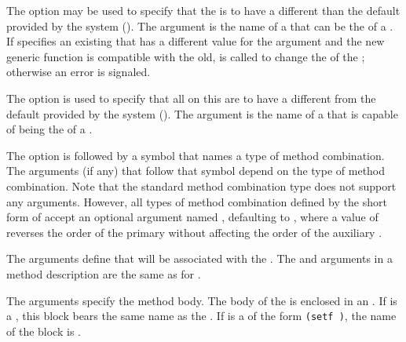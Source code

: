 \itemitem{\bull} 
The  option may be used to specify that
the  is to have a different  than
the default provided by the system ().
The  argument is the name of a  that can be the
 of a .  If  specifies
an existing  that has a different value for the
 argument and the new generic function 
 is compatible with the old,  is called 
to change the  of the ; 
otherwise an error is signaled.
 
\itemitem{\bull} 
The  option is used to specify that all  on
this  are to have a different  from the 
default provided by the system ().
The  argument is the name of a  that is capable 
of being the  of a .
 
\itemitem{\bull} 
The  option is followed by a symbol that
names a type of method combination.  The arguments (if any) that
follow that symbol depend on the type of method combination.  Note
that the standard method combination type does not support any
arguments.  However, all types of method combination defined by the
short form of  accept an optional
argument named , defaulting to ,
where a value of  reverses
the order of the primary  without affecting the order of the
auxiliary .
 
\endlist
 
The  arguments define  that will
be associated with the .  The 
and  arguments in a method description
are the same as for .
 
The  arguments specify the method body.  The body of the
 is enclosed in an .
If  is a , this block bears the same name as
the .  If  is a 
 of the
form {\tt (setf )}, the name of the block is .  
 
